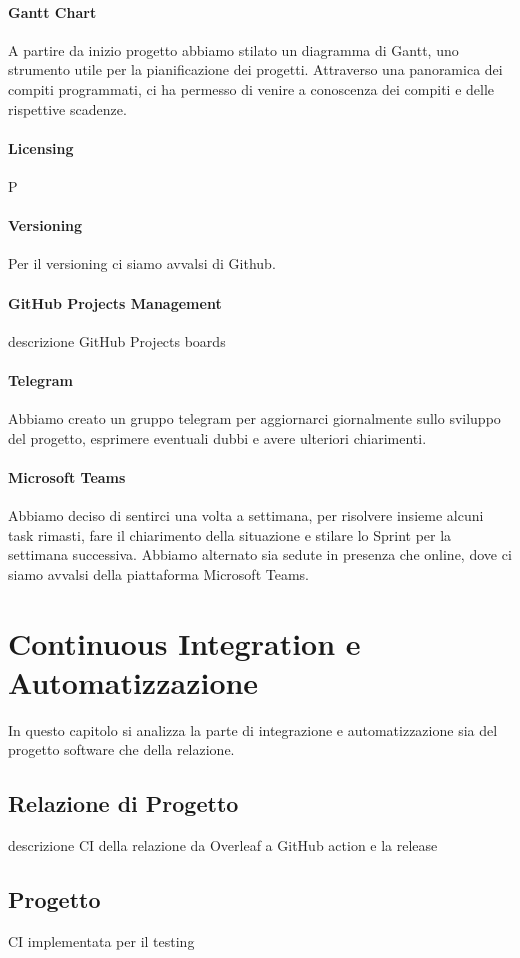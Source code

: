     \paragraph{Gantt Chart} 
    A partire da inizio progetto abbiamo stilato un diagramma di Gantt, uno strumento utile per la pianificazione dei progetti. Attraverso una panoramica dei compiti programmati, ci ha permesso di venire a conoscenza dei compiti e delle rispettive scadenze.
    
    \paragraph{Licensing} P
    
    \paragraph{Versioning}
    Per il versioning ci siamo avvalsi di Github. 
    
    \paragraph{GitHub Projects Management}
    descrizione GitHub Projects boards 
    
    \paragraph{Telegram}
    Abbiamo creato un gruppo telegram per aggiornarci giornalmente sullo sviluppo del progetto, esprimere eventuali dubbi e avere ulteriori chiarimenti. 
    
    \paragraph{Microsoft Teams}
    Abbiamo deciso di sentirci una volta a settimana, per risolvere insieme alcuni task rimasti, fare il chiarimento della situazione e stilare lo Sprint per la settimana successiva. Abbiamo alternato sia sedute in presenza che online, dove ci siamo avvalsi della piattaforma Microsoft Teams.
    
     

\section{Continuous Integration e Automatizzazione}
\label{chap:CI}
In questo capitolo si analizza la parte di integrazione e automatizzazione sia del progetto software che della relazione. 
    \subsection{Relazione di Progetto}
        descrizione CI della relazione da Overleaf a GitHub action e la release

    \subsection{Progetto}
        CI implementata per il testing 
        
        





